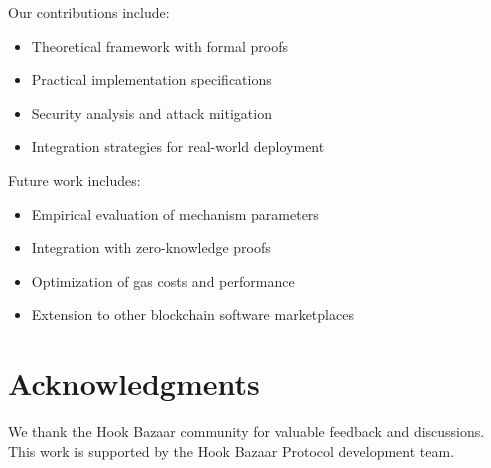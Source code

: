 \documentclass[11pt,a4paper]{article}
\theoremstyle{definition}
\theoremstyle{remark}
\begin{document}
Our contributions include:
\begin{itemize}
    \item Theoretical framework with formal proofs
    \item Practical implementation specifications
    \item Security analysis and attack mitigation
    \item Integration strategies for real-world deployment
\end{itemize}

Future work includes:
\begin{itemize}
    \item Empirical evaluation of mechanism parameters
    \item Integration with zero-knowledge proofs
    \item Optimization of gas costs and performance
    \item Extension to other blockchain software marketplaces
\end{itemize}


\section*{Acknowledgments}

We thank the Hook Bazaar community for valuable feedback and discussions. This work is supported by the Hook Bazaar Protocol development team.

\end{document}
